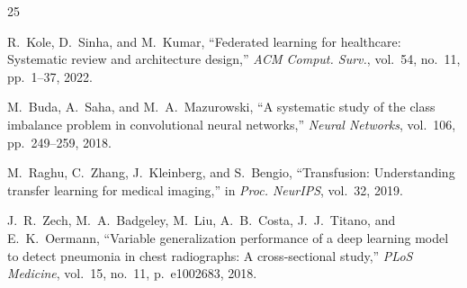 \documentclass[conference]{IEEEtran}
\renewenvironment{thebibliography}[1]{%
  \begin{oldthebibliography}{#1}%
    \setlength{\itemsep}{0.3pt}%
    \setlength{\parskip}{0pt}%
}{%
  \end{oldthebibliography}%
}
\begin{document}
\begin{thebibliography}{25}
R.~Kole, D.~Sinha, and M.~Kumar, ``Federated learning for healthcare: Systematic review and architecture design,'' \textit{ACM Comput. Surv.}, vol.~54, no.~11, pp.~1--37, 2022.

M.~Buda, A.~Saha, and M.~A.~Mazurowski, ``A systematic study of the class imbalance problem in convolutional neural networks,'' \textit{Neural Networks}, vol.~106, pp.~249--259, 2018.

M.~Raghu, C.~Zhang, J.~Kleinberg, and S.~Bengio, ``Transfusion: Understanding transfer learning for medical imaging,'' in \textit{Proc. NeurIPS}, vol.~32, 2019.

J.~R.~Zech, M.~A.~Badgeley, M.~Liu, A.~B.~Costa, J.~J.~Titano, and E.~K.~Oermann, ``Variable generalization performance of a deep learning model to detect pneumonia in chest radiographs: A cross-sectional study,'' \textit{PLoS Medicine}, vol.~15, no.~11, p.~e1002683, 2018.
\end{thebibliography}
\end{document}

